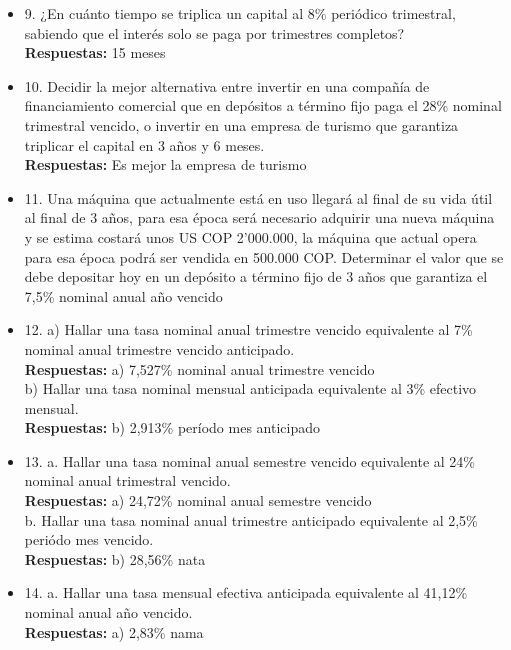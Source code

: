 \begin{itemize}
 \item 9. ¿En cuánto tiempo se triplica un capital al 8\% periódico trimestral, sabiendo que el interés solo se paga por trimestres completos?\\
       \textbf{Respuestas:} 15 meses
       \medskip

 \item 10. Decidir la mejor alternativa entre invertir en una compañía de financiamiento comercial que en depósitos a término fijo paga el 28\% nominal trimestral vencido, o invertir en una empresa de turismo que garantiza triplicar el capital en 3 años y 6 meses.\\
       \textbf{Respuestas:} Es mejor la empresa de turismo
       \medskip

 \item 11. Una máquina que actualmente está en uso llegará al final de su vida útil  al final de 3 años, para esa época será necesario adquirir una nueva máquina y se estima costará unos US COP 2'000.000, la máquina que actual opera para esa época podrá ser vendida en 500.000 COP. Determinar el  valor que se debe depositar hoy en un depósito a término fijo de 3 años que garantiza el 7,5\% nominal anual año vencido  \\
       \medskip

 \item 12. a) Hallar una tasa nominal anual trimestre vencido equivalente al 7\% nominal anual trimestre vencido anticipado.\\
       \textbf{Respuestas:} a) 7,527\% nominal anual trimestre vencido \\

       b) Hallar una tasa nominal mensual anticipada equivalente al 3\% efectivo mensual. \\
       \textbf{Respuestas:} b) 2,913\% período mes anticipado
       \medskip

 \item 13. a. Hallar una tasa nominal anual semestre vencido equivalente al 24\% nominal anual trimestral vencido.\\
       \textbf{Respuestas:} a) 24,72\% nominal anual semestre vencido\\

       b. Hallar una tasa nominal anual trimestre anticipado equivalente al 2,5\% periódo mes vencido.\\
       \textbf{Respuestas:} b) 28,56\% nata
       \medskip

 \item 14.  a. Hallar una tasa mensual efectiva anticipada equivalente al 41,12\% nominal anual año vencido.\\
       \textbf{Respuestas:} a) 2,83\% nama \\


\end{itemize}
